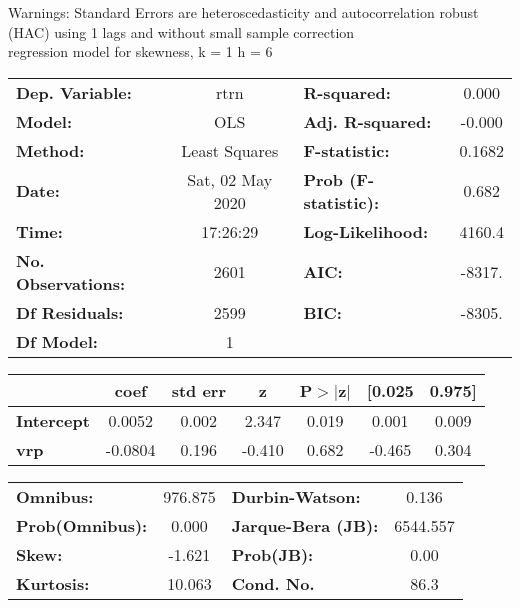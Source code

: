 Warnings: \newline
 [1] Standard Errors are heteroscedasticity and autocorrelation robust (HAC) using 1 lags and without small sample correction\\ 

regression model for skewness, k = 1 h = 6\begin{center}
\begin{tabular}{lclc}
\toprule
\textbf{Dep. Variable:}    &       rtrn       & \textbf{  R-squared:         } &     0.000   \\
\textbf{Model:}            &       OLS        & \textbf{  Adj. R-squared:    } &    -0.000   \\
\textbf{Method:}           &  Least Squares   & \textbf{  F-statistic:       } &    0.1682   \\
\textbf{Date:}             & Sat, 02 May 2020 & \textbf{  Prob (F-statistic):} &    0.682    \\
\textbf{Time:}             &     17:26:29     & \textbf{  Log-Likelihood:    } &    4160.4   \\
\textbf{No. Observations:} &        2601      & \textbf{  AIC:               } &    -8317.   \\
\textbf{Df Residuals:}     &        2599      & \textbf{  BIC:               } &    -8305.   \\
\textbf{Df Model:}         &           1      & \textbf{                     } &             \\
\bottomrule
\end{tabular}
\begin{tabular}{lcccccc}
                   & \textbf{coef} & \textbf{std err} & \textbf{z} & \textbf{P$> |$z$|$} & \textbf{[0.025} & \textbf{0.975]}  \\
\midrule
\textbf{Intercept} &       0.0052  &        0.002     &     2.347  &         0.019        &        0.001    &        0.009     \\
\textbf{vrp}       &      -0.0804  &        0.196     &    -0.410  &         0.682        &       -0.465    &        0.304     \\
\bottomrule
\end{tabular}
\begin{tabular}{lclc}
\textbf{Omnibus:}       & 976.875 & \textbf{  Durbin-Watson:     } &    0.136  \\
\textbf{Prob(Omnibus):} &   0.000 & \textbf{  Jarque-Bera (JB):  } & 6544.557  \\
\textbf{Skew:}          &  -1.621 & \textbf{  Prob(JB):          } &     0.00  \\
\textbf{Kurtosis:}      &  10.063 & \textbf{  Cond. No.          } &     86.3  \\
\bottomrule
\end{tabular}
\end{center}


